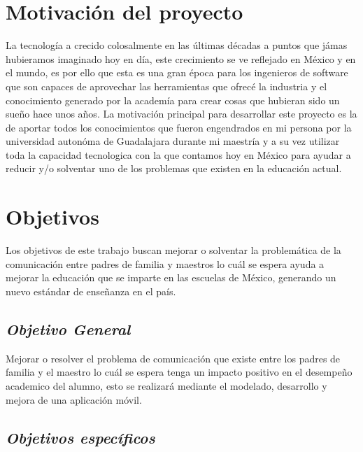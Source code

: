     \section{Motivación del proyecto} \label{motivacionproyecto}

        La tecnología a crecido colosalmente en las últimas décadas a puntos que jámas hubieramos imaginado hoy en día, este crecimiento se ve reflejado en México y en el mundo, es por ello que esta es una gran época para los ingenieros de software que son capaces de aprovechar las herramientas que ofrecé la industria y el conocimiento generado por la academía para crear cosas que hubieran sido un sueño hace unos años. La motivación principal para desarrollar este proyecto es la de aportar todos los conocimientos que fueron engendrados en mi persona por la universidad autonóma de Guadalajara durante mi maestría y a su vez utilizar toda la capacidad tecnologica con la que contamos hoy en México para ayudar a reducir y/o solventar uno de los problemas que existen en la educación actual.


    \section{Objetivos} \label{objetivos}
    
        Los objetivos de este trabajo buscan mejorar o solventar la problemática de la comunicación entre padres de familia y maestros lo cuál se espera ayuda a mejorar la educación que se imparte en las escuelas de México, generando un nuevo estándar de enseñanza en el país. 


        \subsection{\textbf{\textit{Objetivo General}}}
        
            Mejorar o resolver el problema de comunicación que existe entre los padres de familia y el maestro lo cuál se espera tenga un impacto positivo en el desempeño academico del alumno, esto se realizará mediante el modelado, desarrollo y mejora de una aplicación móvil.


        \subsection{\textbf{\textit{Objetivos específicos}}}
        
